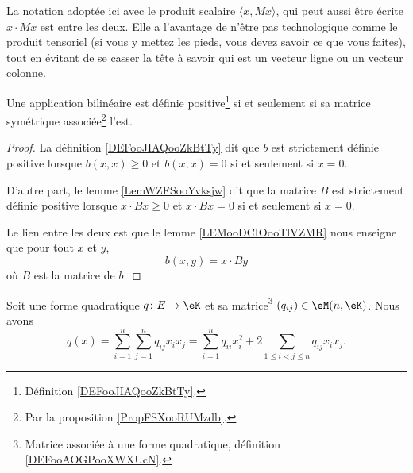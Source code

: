 La notation adoptée ici avec le produit scalaire \( \langle x, Mx\rangle \), qui peut aussi être écrite \( x\cdot Mx\) est entre les deux. Elle a l'avantage de n'être pas technologique comme le produit tensoriel (si vous y mettez les pieds, vous devez savoir ce que vous faites), tout en évitant de se casser la tête à savoir qui est un vecteur ligne ou un vecteur colonne.

\begin{proposition}     \label{PROPooUAAFooEGVDRC} \label{PROPooNQSXooVMFAtU}
	Une application bilinéaire est définie positive\footnote{Définition \ref{DEFooJIAQooZkBtTy}.} si et seulement si sa matrice symétrique associée\footnote{Par la proposition \ref{PropFSXooRUMzdb}.} l'est.
\end{proposition}

\begin{proof}
	La définition \ref{DEFooJIAQooZkBtTy} dit que \( b\) est strictement définie positive lorsque \( b(x,x)\geq 0\) et \( b(x,x)=0\) si et seulement si \( x=0\).

	D'autre part, le lemme \ref{LemWZFSooYvksjw} dit que la matrice \( B\) est strictement définie positive lorsque \( x\cdot Bx\geq 0\) et \( x\cdot Bx=0\) si et seulement si \( x=0\).

	Le lien entre les deux est que le lemme \ref{LEMooDCIOooTlVZMR} nous enseigne que pour tout \( x\) et \( y\),
	\begin{equation}
		b(x,y)=x\cdot By
	\end{equation}
	où \( B\) est la matrice de \( b\).
\end{proof}

\begin{proposition}     \label{PROPooCIEUooODqfwm}
	Soit une forme quadratique \( q\colon E\to \eK\) et sa matrice\footnote{Matrice associée à une forme quadratique, définition \ref{DEFooAOGPooXWXUcN}.} \( (q_{ij})\in \eM(n,\eK)\). Nous avons
	\begin{equation}		\label{EQooAJTUooBSAhKv}
		q(x)  =\sum_{i=1}^n\sum_{j=1}^nq_{ij}x_ix_j                         =\sum_{i=1}^nq_{ii}x_i^2+2\sum_{1\leq i <j\leq n}q_{ij}x_ix_j.
	\end{equation}
\end{proposition}

